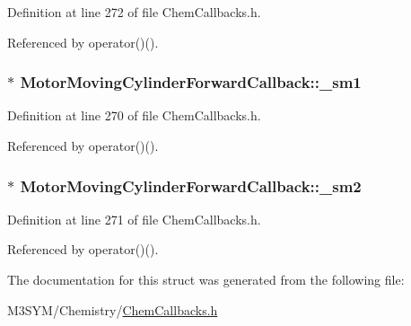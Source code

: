 Definition at line 272 of file Chem\+Callbacks.\+h.



Referenced by operator()().

\hypertarget{structMotorMovingCylinderForwardCallback_afe45cdc1c8c22c183b464a4d4a2b0d59}{
\subsubsection[{\+\_\+sm1}]{$\ast$ Motor\+Moving\+Cylinder\+Forward\+Callback\+::\+\_\+sm1}}\label{structMotorMovingCylinderForwardCallback_afe45cdc1c8c22c183b464a4d4a2b0d59}


Definition at line 270 of file Chem\+Callbacks.\+h.



Referenced by operator()().

\hypertarget{structMotorMovingCylinderForwardCallback_a526a1dcd6458b07f064c77ca75e35c43}{
\subsubsection[{\+\_\+sm2}]{$\ast$ Motor\+Moving\+Cylinder\+Forward\+Callback\+::\+\_\+sm2}}\label{structMotorMovingCylinderForwardCallback_a526a1dcd6458b07f064c77ca75e35c43}


Definition at line 271 of file Chem\+Callbacks.\+h.



Referenced by operator()().



The documentation for this struct was generated from the following file\+:\begin{DoxyCompactItemize}
\item 
M3\+S\+Y\+M/\+Chemistry/\hyperlink{ChemCallbacks_8h}{Chem\+Callbacks.\+h}\end{DoxyCompactItemize}

